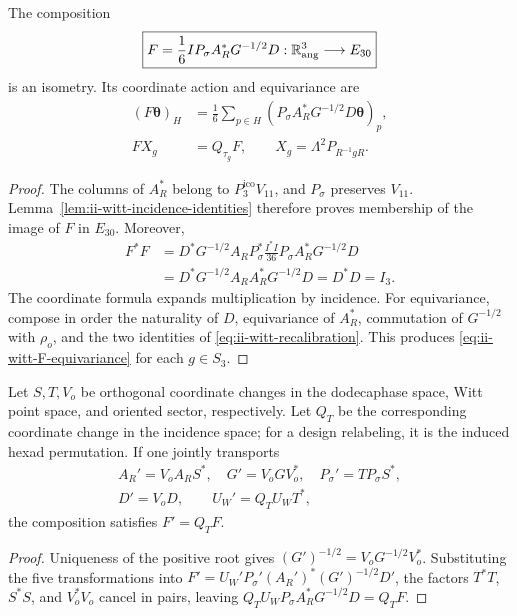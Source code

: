 \begin{theorem}
\label{thm:ii-witt-angular-transport}
The composition
\begin{equation}
 \boxed{F=\frac16 I P_\sigma A_R^*G^{-1/2}D:
        \mathbb R^3_{\rm ang}\longrightarrow E_{30}}
 \label{eq:ii-witt-F}
\end{equation}
is an isometry. Its coordinate action and equivariance are
\begin{align}
 (F\boldsymbol\theta)_H
 &=\frac16\sum_{p\in H}
       (P_\sigma A_R^*G^{-1/2}D\boldsymbol\theta)_p,
       \label{eq:ii-witt-F-coordinates}\\
 F X_g&=Q_{\tau_g}F,
 \qquad X_g=\Lambda^2P_{R^{-1}gR}.
       \label{eq:ii-witt-F-equivariance}
\end{align}
\end{theorem}
\begin{proof}
The columns of \(A_R^*\) belong to \(P_3^{\mathrm{ico}}V_{11}\), and
\(P_\sigma\) preserves \(V_{11}\).
Lemma~\ref{lem:ii-witt-incidence-identities} therefore proves
membership of the image of \(F\) in \(E_{30}\). Moreover,
\begin{align*}
 F^*F
 &=D^*G^{-1/2}A_RP_\sigma^*
       \frac{I^*I}{36}P_\sigma A_R^*G^{-1/2}D\\
 &=D^*G^{-1/2}A_RA_R^*G^{-1/2}D
  =D^*D=I_3.
\end{align*}
The coordinate formula expands multiplication by incidence.
For equivariance, compose in order the naturality of \(D\),
equivariance of \(A_R^*\), commutation of \(G^{-1/2}\) with
\(\rho_o\), and the two identities of
\eqref{eq:ii-witt-recalibration}. This produces
\eqref{eq:ii-witt-F-equivariance} for each \(g\in S_3\).
\end{proof}

\begin{proposition}
\label{prop:ii-witt-gauge-covariance}
Let \(S,T,V_o\) be orthogonal coordinate changes in the dodecaphase
space, Witt point space, and oriented sector,
respectively. Let \(Q_T\) be the corresponding coordinate change
in the incidence space; for a design relabeling, it is the
induced hexad permutation. If one jointly transports
\[
\begin{gathered}
 A_R'=V_oA_RS^*,\quad G'=V_oGV_o^*,\quad
 P_\sigma'=TP_\sigma S^*,\\
 D'=V_oD,\qquad U_W'=Q_TU_WT^*,
\end{gathered}
\]
the composition satisfies \(F'=Q_TF\).
\end{proposition}
\begin{proof}
Uniqueness of the positive root gives
\((G')^{-1/2}=V_oG^{-1/2}V_o^*\). Substituting the five
transformations into
\(F'=U_W'P_\sigma'(A_R')^*(G')^{-1/2}D'\), the factors
\(T^*T\), \(S^*S\), and \(V_o^*V_o\) cancel in pairs, leaving
\(Q_TU_WP_\sigma A_R^*G^{-1/2}D=Q_TF\).
\end{proof}


